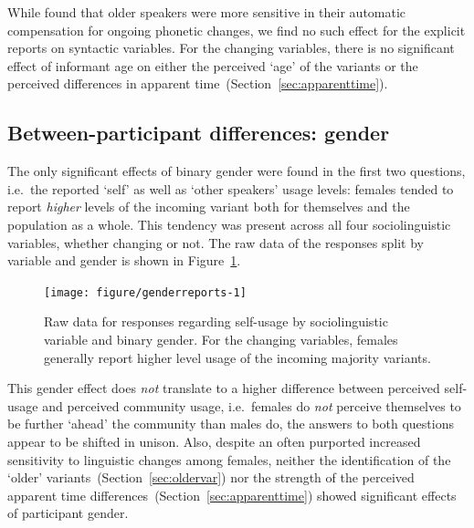 While \citet{Drager2011} found that older speakers were more sensitive in their automatic compensation for ongoing phonetic changes, we find no such effect for the explicit reports on syntactic variables. For the changing variables, there is no significant effect of informant age on either the perceived `age' of the variants %
or the perceived differences in apparent time~(Section~\ref{sec:apparenttime}).%

\subsection{Between-participant differences: gender}

The only significant effects of binary gender were found in the first two questions, i.e.~the reported `self' as well as `other speakers' usage levels: females tended to report \emph{higher} levels of the incoming variant both for themselves and the population as a whole. This tendency was present across all four sociolinguistic variables, whether changing or not.
The raw data of the responses split by variable and gender is shown in Figure~\ref{fig:genderreports}.

\begin{figure}[htbp]

{\centering \texttt{[image: figure/genderreports-1]} 

}

\caption[Raw data for responses regarding self-usage by sociolinguistic variable and binary gender]{Raw data for responses regarding self-usage by sociolinguistic variable and binary gender. For the changing variables, females generally report higher level usage of the incoming majority variants.}\label{fig:genderreports}
\end{figure}



This gender effect does \emph{not} translate to a higher difference between perceived self-usage and perceived community usage, i.e.~females do \emph{not} perceive themselves to be further `ahead' the community than males do, the answers to both questions appear to be shifted in unison. Also, despite an often purported increased sensitivity to linguistic changes among females, neither the identification of the `older' variants~(Section~\ref{sec:oldervar}) nor the strength of the perceived apparent time differences~(Section~\ref{sec:apparenttime}) showed significant effects of participant gender.

